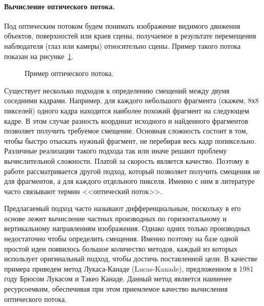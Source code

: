 \paragraph{Вычисление оптического потока.}

Под оптическим потоком будем понимать изображение видимого движения объектов, поверхностей или краев сцены, получаемое в результате перемещения наблюдателя (глаз или камеры) относительно сцены\cite{wikiOpticalFlow}. Пример такого потока показан на рисунке~\ref{pic:OFExample}.

\begin{figure}[!htb]
\caption{Пример оптического потока.}
\label{pic:OFExample}
\end{figure}


Существует несколько подходов к определению смещений между двумя соседними кадрами. Например, для каждого небольшого фрагмента (скажем, 8х8 пикселей) одного кадра находится наиболее похожий фрагмент на следующем кадре. В этом случае разность координат исходного и найденного фрагментов позволяет получить требуемое смещение. Основная сложность состоит в том, чтобы быстро отыскать нужный фрагмент, не перебирая весь кадр попиксельно. Различные реализации такого подхода так или иначе решают проблему вычислительной сложности. Платой за скорость является качество. Поэтому в работе рассматривается другой подход, который позволяет получить смещения не для фрагментов, а для каждого отдельного пикселя. Именно с ним в литературе часто связывают термин <<оптический поток>>. 

Предлагаемый подход часто называют дифференциальным, поскольку в его основе лежит вычисление частных производных по горизонтальному и вертикальному направлениям изображения. Однако одних только производных недостаточно чтобы определить смещения. Именно поэтому на базе одной простой идеи появилось большое количество методов, каждый из которых использует оригинальный подход, чтобы достичь поставленной цели. В качестве примера приведем метод Лукаса-Канаде (Lucas-Kanade), предложенном в 1981 году Брюсом Лукасом и Такео Канаде. Данный метод является наименее ресурсоемким\cite{habrOpticalFlowAbout}, обеспечивая при этом приемлемое качество вычисления оптического потока. 

